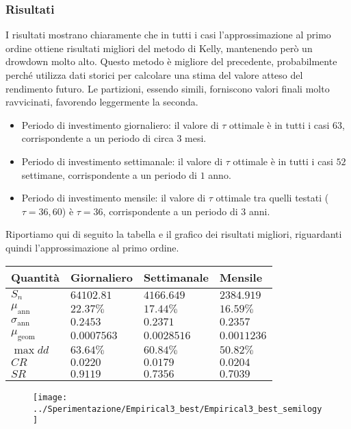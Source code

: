 \documentclass[a4paper,11pt]{book}
\theoremstyle{plain}
\theoremstyle{definition}
\theoremstyle{remark}
\begin{document}
\subsubsection{Risultati}
I risultati mostrano chiaramente che in tutti i casi l'approssimazione al primo ordine ottiene risultati migliori del metodo di Kelly, mantenendo però un drowdown molto alto. Questo metodo è migliore del precedente, probabilmente perché utilizza dati storici per calcolare una stima del valore atteso del rendimento futuro. Le partizioni, essendo simili, forniscono valori finali molto ravvicinati, favorendo leggermente la seconda.
\begin{itemize}
	\item Periodo di investimento giornaliero: il valore di $\tau$ ottimale è in tutti i casi $63$, corrispondente a un periodo di circa $3$ mesi.
	\item Periodo di investimento settimanale: il valore di $\tau$ ottimale è in tutti i casi $52$ settimane, corrispondente a un periodo di $1$ anno.
	\item Periodo di investimento mensile: il valore di $\tau$ ottimale tra quelli testati ($\tau = 36,60$) è $\tau =36$, corrispondente a un periodo di $3$ anni.
\end{itemize}
Riportiamo qui di seguito la tabella e il grafico dei risultati migliori, riguardanti quindi l'approssimazione al primo ordine.
\begin{table}[H]
	\centering
	\begin{tabular}{|l|l|l|l|}
		\hline
		Quantità 			  & Giornaliero	 & Settimanale	& Mensile		\\\hline
		$S_n$                 & $64102.81$   & $4166.649$	& $2384.919$ 	\\
		$\mu_{\text{ann}}$    & $22.37\%$    & $17.44\%$	& $16.59\%$		\\
		$\sigma_{\text{ann}}$ & $0.2453$     & $0.2371$		& $0.2357$		\\
		$\mu_{\text{geom}}$   & $0.0007563$  & $0.0028516$	& $0.0011236$	\\
		$\max dd$             & $63.64\%$    & $60.84\%$	& $50.82\%$		\\
		$CR$                  & $0.0220$     & $0.0179$		& $0.0204$		\\
		$SR$                  & $0.9119$     & $0.7356$		& $0.7039$		\\\hline
	\end{tabular}
\end{table}
\begin{figure}[H]
	\centering
	\texttt{[image: ../Sperimentazione/Empirical3\_best/Empirical3\_best\_semilogy]}
	\caption{}
	\label{fig:empirical3bestsemilogy}
\end{figure}
\end{document}
